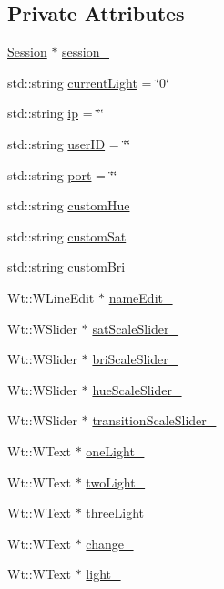 \subsection*{Private Attributes}
\begin{DoxyCompactItemize}
\item 
\hyperlink{classSession}{Session} $\ast$ \hyperlink{classLightsControlWidget_ad27e600149ef3590947a491470dcb4c8}{session\+\_\+}
\item 
std\+::string \hyperlink{classLightsControlWidget_ace513933420460bc8fbb508d865491d4}{current\+Light} = \char`\"{}0\char`\"{}
\item 
std\+::string \hyperlink{classLightsControlWidget_aa2855e24d3d1afbcf6fcd2992abc47af}{ip} = \char`\"{}\char`\"{}
\item 
std\+::string \hyperlink{classLightsControlWidget_aa26d4553e677dec57b64575a6d6d8558}{user\+ID} = \char`\"{}\char`\"{}
\item 
std\+::string \hyperlink{classLightsControlWidget_a5760f7ec7c3c36e8faf00ae6b2633ab5}{port} = \char`\"{}\char`\"{}
\item 
std\+::string \hyperlink{classLightsControlWidget_a2db5ec044ec1156bf73dc2ae0a997289}{custom\+Hue}
\item 
std\+::string \hyperlink{classLightsControlWidget_ac19d3dd4895b03ccfe686cffd51c27fd}{custom\+Sat}
\item 
std\+::string \hyperlink{classLightsControlWidget_a5d4fcb296c966e544f26269debbc0a85}{custom\+Bri}
\item 
Wt\+::\+W\+Line\+Edit $\ast$ \hyperlink{classLightsControlWidget_aff7b495c562df75a6006ad6bef43f96f}{name\+Edit\+\_\+}
\item 
Wt\+::\+W\+Slider $\ast$ \hyperlink{classLightsControlWidget_af957447fbfc39f4f0c87081be5cf2bf5}{sat\+Scale\+Slider\+\_\+}
\item 
Wt\+::\+W\+Slider $\ast$ \hyperlink{classLightsControlWidget_aafc30b2cc242d6ac2575128a491298d3}{bri\+Scale\+Slider\+\_\+}
\item 
Wt\+::\+W\+Slider $\ast$ \hyperlink{classLightsControlWidget_a71c03598de2481409316e7d1ca51fda0}{hue\+Scale\+Slider\+\_\+}
\item 
Wt\+::\+W\+Slider $\ast$ \hyperlink{classLightsControlWidget_af4bd66ddc5244ab9cf62dea9e5ffb1cf}{transition\+Scale\+Slider\+\_\+}
\item 
Wt\+::\+W\+Text $\ast$ \hyperlink{classLightsControlWidget_a5d33dac9a47a7862e6cc060e1e0fb335}{one\+Light\+\_\+}
\item 
Wt\+::\+W\+Text $\ast$ \hyperlink{classLightsControlWidget_a1148be7db38088bb15fc356e06e13b65}{two\+Light\+\_\+}
\item 
Wt\+::\+W\+Text $\ast$ \hyperlink{classLightsControlWidget_a82b1ded41fd126f7f4e041ab5b0b7ccb}{three\+Light\+\_\+}
\item 
Wt\+::\+W\+Text $\ast$ \hyperlink{classLightsControlWidget_a27b0c91e6a4776c8b03dfc5324e3e365}{change\+\_\+}
\item 
Wt\+::\+W\+Text $\ast$ \hyperlink{classLightsControlWidget_a071eae068aef8f47a36e728ae3ad6378}{light\+\_\+}
\end{DoxyCompactItemize}


